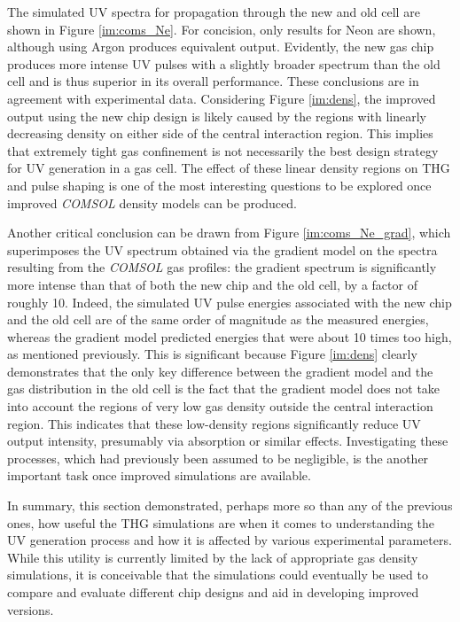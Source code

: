 \documentclass[a4paper]{jpconf}
\begin{document}
The simulated UV spectra for propagation through the new and old cell are shown in Figure \ref{im:coms_Ne}. For concision, only results for Neon are shown, although using Argon produces equivalent output. Evidently, the new gas chip produces more intense UV pulses with a slightly broader spectrum than the old cell and is thus superior in its overall performance. These conclusions are in agreement with experimental data. Considering Figure \ref{im:dens}, the improved output using the new chip design is likely caused by the regions with linearly decreasing density on either side of the central interaction region. This implies that extremely tight gas confinement is not necessarily the best design strategy for UV generation in a gas cell. The effect of these linear density regions on THG and pulse shaping is one of the most interesting questions to be explored once improved \textit{COMSOL} density models can be produced. \par 
Another critical conclusion can be drawn from Figure \ref{im:coms_Ne_grad}, which superimposes the UV spectrum obtained via the gradient model on the spectra resulting from the \textit{COMSOL} gas profiles: the gradient spectrum is significantly more intense than that of both the new chip and the old cell, by a factor of roughly 10. Indeed, the simulated UV pulse energies associated  with the new chip and the old cell are of the same order of magnitude as the measured energies, whereas the gradient model predicted energies that were about 10 times too high, as mentioned previously. This is significant because Figure \ref{im:dens} clearly demonstrates that the only key difference between the gradient model and the gas distribution in the old cell is the fact that the gradient model does not take into account the regions of very low gas density outside the central interaction region. This indicates that these low-density regions significantly reduce UV output intensity, presumably via absorption or similar effects. Investigating these processes, which had previously been assumed to be negligible, is the another important task once improved simulations are available. \par 
In summary, this section demonstrated, perhaps more so than any of the previous ones, how useful the THG simulations are when it comes to understanding the UV generation process and how it is affected by various experimental parameters. While this utility is currently limited by the lack of appropriate gas density simulations, it is conceivable that the simulations could eventually be used to compare and evaluate different chip designs and aid in developing improved versions. 
\end{document}
